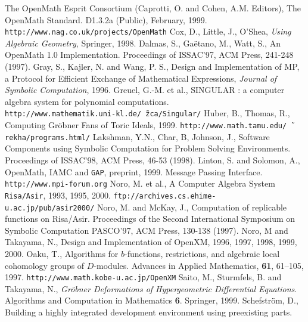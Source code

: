 
\begin{thebibliography}{X}
The OpenMath Esprit Consortium 
(Caprotti, O. and Cohen, A.M. Editors),
The OpenMath Standard. D1.3.2a (Public), February, 1999.
{\tt http://www.nag.co.uk/projects/OpenMath}
Cox, D., Little, J.,  O'Shea,
{\it Using Algebraic Geometry}, Springer, 1998.
Dalmas, S., Ga\"etano, M., Watt, S., An OpenMath 1.0 Implementation.
Proceedings of ISSAC'97, ACM Press, 241-248 (1997).
Gray, S., Kajler, N. and Wang, P. S.,
Design and Implementation of MP, a Protocol for Efficient
  Exchange of Mathematical Expressions,
{\sl Journal of Symbolic Computation}, 1996.
Greuel, G.-M. et al., SINGULAR : a computer algebra system for polynomial
computations.\\
{\tt http://www.mathematik.uni-kl.de/\~\,zca/Singular/}
Huber, B., Thomas, R., Computing Gr\"obner Fans of Toric Ideals, 1999.
{\tt http://www.math.tamu.edu/\~\,rekha/programs.html/}
Lakshman, Y.N., Char, B, Johnson, J., Software Components using
Symbolic Computation for Problem Solving Environments.
Proceedings of ISSAC'98, ACM Press, 46-53 (1998).
Linton, S. and Solomon, A.,
OpenMath, IAMC and {\tt GAP},
preprint, 1999.
 Message Passing Interface.
{\tt http://www.mpi-forum.org} 
Noro, M. et al., 
A Computer Algebra System {\tt Risa/Asir},  1993, 1995, 2000.
{\tt ftp://archives.cs.ehime-u.ac.jp/pub/asir2000/}
Noro, M. and McKay, J.,
Computation of replicable functions on Risa/Asir.
Proceedings of the Second International Symposium on
Symbolic Computation PASCO'97, ACM Press, 130-138 (1997).
Noro, M and Takayama, N., Design and Implementation
of OpenXM, 1996, 1997, 1998, 1999, 2000.
Oaku, T.,
Algorithms for $b$-functions, restrictions, and algebraic local cohomology
groups of $D$-modules.
Advances in Applied Mathematics, {\bf 61}, 61--105, 1997.
{\tt http://www.math.kobe-u.ac.jp/OpenXM}
Saito, M., Sturmfels, B. and Takayama, N.,
{\it Gr\"obner Deformations of Hypergeometric Differential Equations}.
Algorithms and Computation in Mathematics {\bf 6}. Springer, 1999.
Schefstr\"om, D.,
Building a highly integrated development environment using
preexisting parts.

\end{thebibliography}
